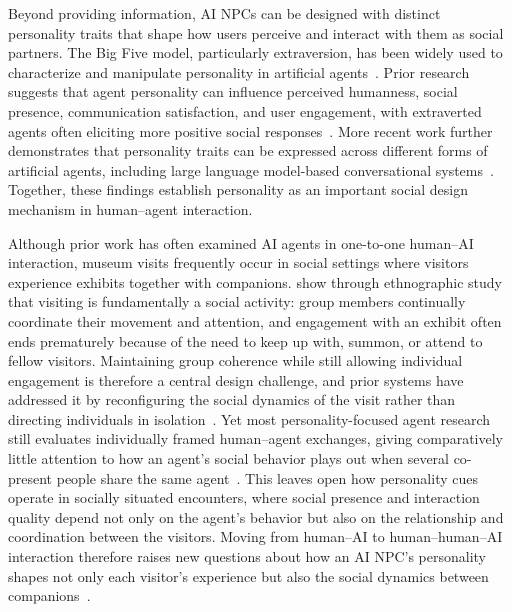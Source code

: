 \documentclass[a4paper,fleqn]{cas-sc}
\begin{document}
Beyond providing information, AI NPCs can be designed with distinct personality traits that shape how users perceive and interact with them as social partners. The Big Five model, particularly extraversion, has been widely used to characterize and manipulate personality in artificial agents~\citep{neffEvaluatingEffectGesture2010, ahmadFrameworkPersonalityCues2022}. Prior research suggests that agent personality can influence perceived humanness, social presence, communication satisfaction, and user engagement, with extraverted agents often eliciting more positive social responses~\citep{leeCanRobotsManifest2006, ahmadCommunicatingMachinesConversational2021, volkelUserPerceptionsExtraversion2022}. More recent work further demonstrates that personality traits can be expressed across different forms of artificial agents, including large language model-based conversational systems~\citep{jiangPersonaLLMInvestigatingAbility2024}. Together, these findings establish personality as an important social design mechanism in human--agent interaction.

Although prior work has often examined AI agents in one-to-one human--AI interaction, museum visits frequently occur in social settings where visitors experience exhibits together with companions. \citet{tolmieSupportingGroupInteractions2014} show through ethnographic study that visiting is fundamentally a social activity: group members continually coordinate their movement and attention, and engagement with an exhibit often ends prematurely because of the need to keep up with, summon, or attend to fellow visitors. Maintaining group coherence while still allowing individual engagement is therefore a central design challenge, and prior systems have addressed it by reconfiguring the social dynamics of the visit rather than directing individuals in isolation~\citep{foshSupportingGroupCoherence2016, foshGiftingPersonalInterpretations2014}. Yet most personality-focused agent research still evaluates individually framed human--agent exchanges, giving comparatively little attention to how an agent's social behavior plays out when several co-present people share the same agent~\citep{ahmadCommunicatingMachinesConversational2021, volkelUserPerceptionsExtraversion2022}. This leaves open how personality cues operate in socially situated encounters, where social presence and interaction quality depend not only on the agent's behavior but also on the relationship and coordination between the visitors. Moving from human--AI to human--human--AI interaction therefore raises new questions about how an AI NPC's personality shapes not only each visitor's experience but also the social dynamics between companions~\citep{ohSystematicReviewSocial2018, yuIntegratingMixedReality}.
\end{document}
